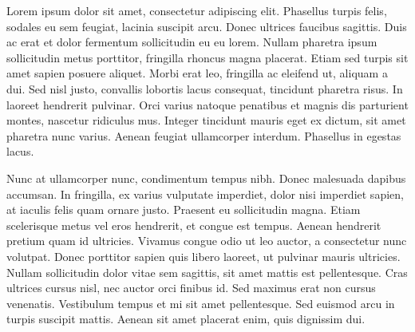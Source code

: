 \documentclass[11pt]{article}
\begin{document}
Lorem ipsum dolor sit amet, consectetur adipiscing elit. Phasellus turpis felis, sodales eu sem feugiat, lacinia suscipit arcu. Donec ultrices faucibus sagittis. Duis ac erat et dolor fermentum sollicitudin eu eu lorem. Nullam pharetra ipsum sollicitudin metus porttitor, fringilla rhoncus magna placerat. Etiam sed turpis sit amet sapien posuere aliquet. Morbi erat leo, fringilla ac eleifend ut, aliquam a dui. Sed nisl justo, convallis lobortis lacus consequat, tincidunt pharetra risus. In laoreet hendrerit pulvinar. Orci varius natoque penatibus et magnis dis parturient montes, nascetur ridiculus mus. Integer tincidunt mauris eget ex dictum, sit amet pharetra nunc varius. Aenean feugiat ullamcorper interdum. Phasellus in egestas lacus. 

Nunc at ullamcorper nunc, condimentum tempus nibh. Donec malesuada dapibus accumsan. In fringilla, ex varius vulputate imperdiet, dolor nisi imperdiet sapien, at iaculis felis quam ornare justo. Praesent eu sollicitudin magna. Etiam scelerisque metus vel eros hendrerit, et congue est tempus. Aenean hendrerit pretium quam id ultricies. Vivamus congue odio ut leo auctor, a consectetur nunc volutpat. Donec porttitor sapien quis libero laoreet, ut pulvinar mauris ultricies. Nullam sollicitudin dolor vitae sem sagittis, sit amet mattis est pellentesque. Cras ultrices cursus nisl, nec auctor orci finibus id. Sed maximus erat non cursus venenatis. Vestibulum tempus et mi sit amet pellentesque. Sed euismod arcu in turpis suscipit mattis. Aenean sit amet placerat enim, quis dignissim dui. 
\end{document}
